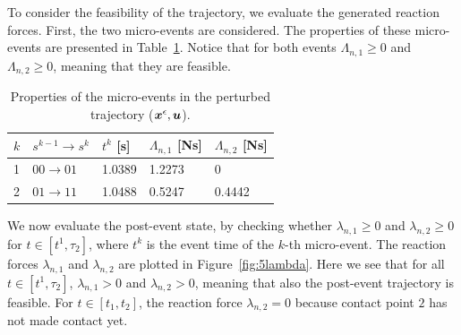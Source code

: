 \documentclass[../DC2019003Bouma.tex]{subfiles}
\begin{document}

To consider the feasibility of the trajectory, we evaluate the generated reaction forces. First, the two micro-events are considered. The properties of these micro-events are presented in Table~\ref{tab:pertevent}. Notice that for both events $\Lambda_{n,1}\geq 0$ and $\Lambda_{n,2}\geq 0$, meaning that they are feasible.
\begin{table}[h!]
\centering
\caption{Properties of the micro-events in the perturbed trajectory (${\boldsymbol{x}}^\epsilon,{\boldsymbol{u}}$).}\label{tab:pertevent}
\begin{tabular}{l|l|l|l|l}
$k$ & $s^{k-1}\rightarrow s^k$ & $t^k$ {[}s{]} & $\Lambda_{n,1}$ {[}Ns{]} & $\Lambda_{n,2}$ {[}Ns{]} \\ \hline
1   & $00\rightarrow 01$       & 1.0389        & 1.2273                   & 0                        \\
2   & $01\rightarrow 11$       & 1.0488        & 0.5247                   & 0.4442                  
\end{tabular}
\end{table}

We now evaluate the post-event state, by checking whether $\lambda_{n,1}\geq 0$ and $\lambda_{n,2}\geq 0$ for $t\in [t^1,\tau_2]$, where $t^k$ is the event time of the $k$-th micro-event. The reaction forces $\lambda_{n,1}$ and $\lambda_{n,2}$ are plotted in Figure~\ref{fig:5lambda}. Here we see that for all $t\in [t^1,\tau_2]$, $\lambda_{n,1}> 0$ and $\lambda_{n,2}> 0$, meaning that also the post-event trajectory is feasible. For $t\in[t_1,t_2]$, the reaction force $\lambda_{n,2}= 0$ because contact point $2$ has not made contact yet.
\end{document}
